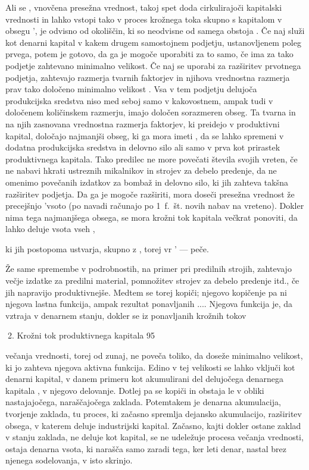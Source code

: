 \documentclass[kapital_02.tex]{subfiles}
\begin{document}
Ali se \KPEd, vnovčena presežna vrednost, takoj spet doda cirkulirajoči kapitalski vrednosti in lahko vstopi tako v proces krožnega toka skupno s kapitalom \KPED v obsegu \KPED', je odvisno od okoliščin, ki so neodvisne od samega obstoja \KPEd. Če naj služi \KPEd kot denarni kapital v kakem drugem samostojnem podjetju, ustanovljenem poleg prvega, potem je gotovo, da ga je mogoče uporabiti za to samo, če ima za tako podjetje zahtevano minimalno velikost. Če naj se uporabi za razširitev prvotnega podjetja, zahtevajo razmerja tvarnih faktorjev in njihova vrednostna razmerja prav tako določeno minimalno velikost \KPEd. Vsa v tem podjetju delujoča produkcijska sredstva niso med seboj samo v kakovostnem, ampak tudi v določenem količinskem razmerju, imajo določen sorazmeren obseg. Ta tvarna in na njih zasnovana vrednostna razmerja faktorjev, ki preidejo v produktivni kapital, določajo najmanjši obseg, ki ga mora imeti \KPEd, da se lahko spremeni v dodatna produkcijska sredstva in delovno silo ali samo v prva kot prirastek produktivnega kapitala. Tako predilec ne more povečati števila svojih vreten, če ne nabavi hkrati ustreznih mikalnikov in strojev za debelo predenje, da ne omenimo povečanih izdatkov za bombaž in delovno silo, ki jih zahteva takšna razširitev podjetja. Da ga je mogoče razširiti, mora doseči presežna vrednost že precejšnjo 'vsoto (po navadi računajo po 1~f.~št. novih nabav na vreteno). Dokler nima \KPEd tega najmanjšega obsega, se mora krožni tok kapitala večkrat ponoviti, da lahko deluje vsota vseh \KPEd,

ki jih postopoma ustvarja, skupno z \KPED, torej vr \KPED' — peče.

Že same spremembe v podrobnostih, na primer pri predilnih strojih, zahtevajo večje izdatke za predilni material, pomnožitev strojev za debelo predenje itd., če jih napravijo produktivnejše. Medtem se \KPEd torej kopiči; njegovo kopičenje pa ni njegova lastna funkcija, ampak rezultat ponavljanih \KPEP...\KPEP. Njegova funkcija je, da vztraja v denarnem stanju, dokler se iz ponavljanih krožnih tokov



2. Krožni tok produktivnega kapitala 95



 večanja vrednosti, torej od zunaj, ne poveča toliko, da doseže minimalno velikost, ki jo zahteva njegova aktivna funkcija. Edino v tej velikosti se lahko vključi kot denarni kapital, v danem primeru kot akumulirani del delujočega denarnega kapitala \KPED, v njegovo delovanje. Dotlej pa se kopiči in obstaja le v obliki nastajajočega, naraščajočega zaklada. Potemtakem je denarna akumulacija, tvorjenje zaklada, tu proces, ki začasno spremlja dejansko akumulacijo, razširitev obsega, v katerem deluje industrijski kapital. Začasno, kajti dokler ostane zaklad v stanju zaklada, ne deluje kot kapital, se ne udeležuje procesa večanja vrednosti, ostaja denarna vsota, ki narašča samo zaradi tega, ker leti denar, nastal brez njenega sodelovanja, v isto skrinjo.
\end{document}
